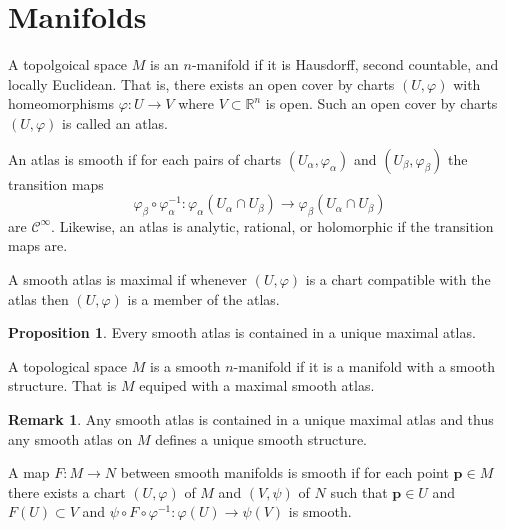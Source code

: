 \documentclass[12pt]{extarticle}
\newcommand{\R}{\mathbb{R}}
\theoremstyle{definition}
\newtheorem{proposition}[theorem]{Proposition}
\newtheorem{remark}{Remark}
\newenvironment{definition}[1][Definition:]{\begin{trivlist}
\item[\hskip \labelsep {\bfseries #1}]}{\end{trivlist}}
\renewcommand{\bf}[1]{\mathbf{#1}}
\newcommand{\C}[1]{\mathcal{C}^{#1}}
\begin{document}
\section{Manifolds}

\begin{definition}
A topolgoical space $M$ is an $n$-manifold if it is Hausdorff, second countable, and locally Euclidean. That is, there exists an open cover by charts $(U, \varphi)$ with homeomorphisms $\varphi : U \to V$ where $V \subset \R^n$ is open. Such an open cover by charts $(U, \varphi)$ is called an atlas.    
\end{definition}

\begin{definition}
An atlas is smooth if for each pairs of charts $(U_{\alpha}, \varphi_{\alpha})$ and $(U_{\beta}, \varphi_{\beta})$ the transition maps 
\[\varphi_{\beta} \circ \varphi_{\alpha}^{-1} : \varphi_{\alpha}(U_{\alpha} \cap U_{\beta}) \to \varphi_{\beta}(U_{\alpha} \cap U_{\beta}) \]
are $\C{\infty}$. Likewise, an atlas is analytic, rational, or holomorphic if the transition maps are.  
\end{definition}

\begin{definition}
A smooth atlas is maximal if whenever $(U, \varphi)$ is a chart compatible with the atlas then $(U, \varphi)$ is a member of the atlas. 
\end{definition}

\begin{proposition}
Every smooth atlas is contained in a unique maximal atlas.
\end{proposition}

\begin{definition}
A topological space $M$ is a smooth $n$-manifold if it is a manifold with a smooth structure. That is $M$ equiped with a maximal smooth atlas. 
\end{definition}

\begin{remark}
Any smooth atlas is contained in a unique maximal atlas and thus any smooth atlas on $M$ defines a unique smooth structure. 
\end{remark}

\begin{definition}
A map $F : M \to N$ between smooth manifolds is smooth if for each point $\bf{p} \in M$ there exists a chart $(U, \varphi)$ of $M$ and $(V, \psi)$ of $N$ such that $\bf{p} \in U$ and $F(U) \subset V$ and $\psi \circ F \circ \varphi^{-1} : \varphi(U) \to \psi(V)$ is smooth. 
\end{definition}
\end{document}
